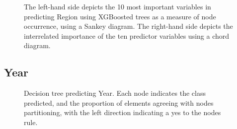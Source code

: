\documentclass[review,12pt,authoryear]{elsarticle}
\begin{document}
\begin{linenumbers}
\begin{figure}
  \caption{The left-hand side depicts the 10 most important variables in predicting Region using XGBoosted trees as a measure of node occurrence, using a Sankey diagram. The right-hand side depicts the interrelated importance of the ten predictor variables using a chord diagram.}\label{fig:region_sankey}
\end{figure}

\subsection{Year}

\begin{figure}
  \caption{Decision tree predicting Year. Each node indicates the class predicted, and the proportion of elements agreeing with nodes partitioning, with the left direction indicating a yes to the nodes rule.}\label{fig:year_tree}
\end{figure}


\end{linenumbers}
\end{document}
